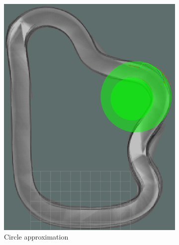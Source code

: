 \begin{figure} 
	\centering
	\begin{subfigure}{.45\linewidth}
		\includegraphics[width=\textwidth]{Pictures/circle approx}
		\caption{Circle approximation}
		\end{subfigure}	
	\begin{subfigure}{.45\linewidth}

\end{subfigure}
\end{figure}
